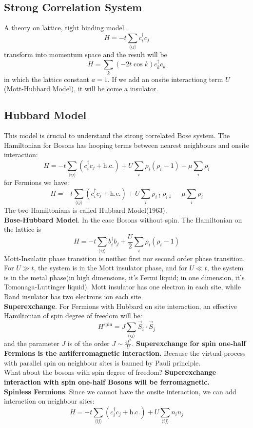 \documentclass{article}
\begin{document}
\subsection{Strong Correlation System}
A theory on lattice, tight binding model.
$$
H = -t\sum_{\langle ij\rangle}c^\dagger_i c_j
$$
transform into momentum space and the result will be
$$
H = \sum_k (-2t\cos{k})c^\dagger_kc_k
$$
in which the lattice constant $a = 1$. If we add an onsite interactiong term $U$ (Mott-Hubbard Model), it will be come a insulator.
\subsection{Hubbard Model}
This model is crucial to understand the strong correlated Bose system.
The Hamiltonian for Bosons has hooping terms between nearest neighbours and onsite interaction:
$$
H = -t\sum_{\langle ij\rangle}(c^\dagger_i c_j + \mathrm{h.c.})+ U\sum_i \rho_i(\rho_i-1) - \mu\sum_i\rho_i
$$
for Fermions we have:
$$
H = -t\sum_{\langle ij\rangle}(c^\dagger_i c_j + \mathrm{h.c.})+ U\sum_i \rho_{i\uparrow}\rho_{i\downarrow} - \mu\sum_i\rho_i
$$
The two Hamiltonians is called Hubbard Model(1963).\\
{\bf{Bose-Hubbard Model}}. In the case Bosons without spin. The Hamiltonian on the lattice is
$$
H = -t\sum_{\langle ij\rangle} b^\dagger_i b_j + \frac{U}{2}\sum_{i}\rho_i(\rho_i-1)
$$
Mott-Insulatir phase transition is neither first nor second order phase transition. For $U\gg t$, the system is in the Mott insulator phase, and for $U\ll t$, the system is in the metal phase(in high dimensions, it's Fermi liquid; in one dimension, it's Tomonaga-Luttinger liquid). Mott insulator has one electron in each site, while Band insulator has two electrons ion each site
\\{\bf{Superexchange}}. For Fermions with Hubbard on site interaction, an effective Hamiltonian of spin degree of freedom will be:
$$
H^\mathrm{spin} = J\sum_{\langle ij\rangle}\vec{S}_i\cdot\vec{S}_j
$$
and the parameter $J$ is of the order $J\sim \frac{4t^2}{U}$. {\bf{Superexchange for spin one-half Fermions is the antiferromagnetic interaction.}} Because the virtual process with parallel spin on neighbour sites is banned by Pauli principle.\\
What about the bosons with spin degree of freedom? {\bf{Superexchange interaction with spin one-half Bosons will be ferromagnetic.}}\\
{\bf{Spinless Fermions}}. Since we cannot have the onsite interaction, we can add interaction on neighbour sites:
$$
H = -t\sum_{\langle ij\rangle}(c^\dagger_ic_j + \mathrm{h.c.}) + U\sum_{\langle ij\rangle}n_i n_j
$$
\end{document}
